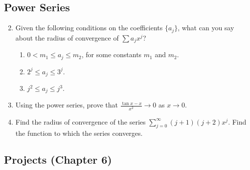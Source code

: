 \documentclass{article}
\begin{document}
\subsection{Power Series}

\begin{enumerate}
    \setcounter{enumi}{1}
    \item Given the following conditions on the coefficients $\{a_j\}$, what
          can you say about the radius of convergence of $\sum a_jx^j$?
          \begin{enumerate}
              \item $0<m_1\leq a_j\leq m_2$, for some constants $m_1$ and $m_2$.
              \item $2^j\leq a_j\leq 3^j$.
              \item $j^2\leq a_j\leq j^3$.
          \end{enumerate}
          \setcounter{enumi}{5}
    \item Using the power series, prove that
          $\frac{\tan x-x}{x^2}\to 0$ as $x\to 0$.
          \setcounter{enumi}{10}
    \item Find the radius of convergence of the series
          $\sum_{j=0}^\infty(j+1)(j+2)x^j$. Find the function to which
          the series converges.
\end{enumerate}

\subsection*{Projects (Chapter 6)}
\end{document}
